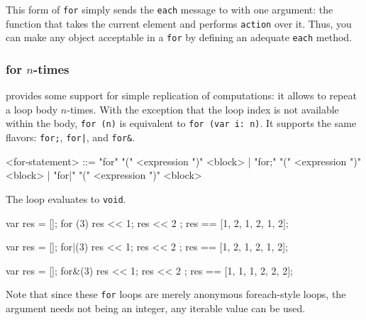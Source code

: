 This form of \lstinline|for| simply sends the \lstinline|each| message
to  with one argument: the function that takes the
current element and performs \lstinline|action| over it. Thus, you can
make any object acceptable in a \lstinline|for| by defining an
adequate \lstinline|each| method.


\subsubsection{for $n$-times}
\label{sec:lang:for:n}

\us provides some support for simple replication of computations: it allows
to repeat a loop body $n$-times.  With the exception that the loop index is
not available within the body, \lstinline|for (n)| is equivalent to
\lstinline|for (var i: n)|.  It supports the same flavors: \lstinline|for;|,
\lstinline{for|}, and \lstinline|for&|.

\begin{bnf}
<for-statement>
   ::= "for" "(" <expression ")" <block>
     | "for;" "(" <expression ")" <block>
     | "for|" "(" <expression ")" <block>
\end{bnf}

The loop evaluates to \lstinline|void|.

\begin{urbiassert}
{ var res = []; for (3) { res << 1; res << 2 } ; res }
        == [1, 2, 1, 2, 1, 2];

{ var res = []; for|(3) { res << 1; res << 2 } ; res }
        == [1, 2, 1, 2, 1, 2];

{ var res = []; for&(3) { res << 1; res << 2 } ; res }
        == [1, 1, 1, 2, 2, 2];
\end{urbiassert}

Note that since these \lstinline|for| loops are merely anonymous
foreach-style loops, the argument needs not being an integer, any iterable
value can be used.

